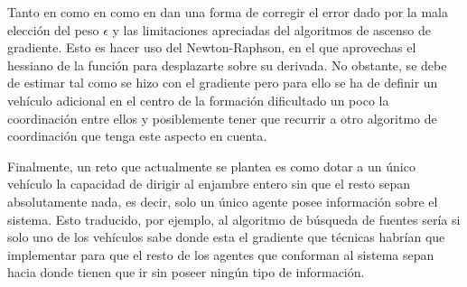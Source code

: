 Tanto en como en \cite{Estimacion_Gradiente} como en \cite{Adicional_Estimacion_1} dan una forma de corregir el error dado por la mala elección del peso $\epsilon$ y las limitaciones apreciadas del algoritmos de ascenso de gradiente. Esto es hacer uso del Newton-Raphson, en el que aprovechas el hessiano de la función para desplazarte sobre su derivada. No obstante, se debe de estimar tal como se hizo con el gradiente pero para ello se ha de definir un vehículo adicional en el centro de la formación dificultado un poco la coordinación entre ellos y posiblemente tener que recurrir a otro algoritmo de coordinación que tenga este aspecto en cuenta.

Finalmente, un reto que actualmente se plantea es como dotar a un único vehículo la capacidad de dirigir al enjambre entero sin que el resto sepan absolutamente nada, es decir, solo un único agente posee información sobre el sistema. Esto traducido, por ejemplo, al algoritmo de búsqueda de fuentes sería si solo uno de los vehículos sabe donde esta el gradiente que técnicas habrían que implementar para que el resto de los agentes que conforman al sistema sepan hacia donde tienen que ir sin poseer ningún tipo de información.